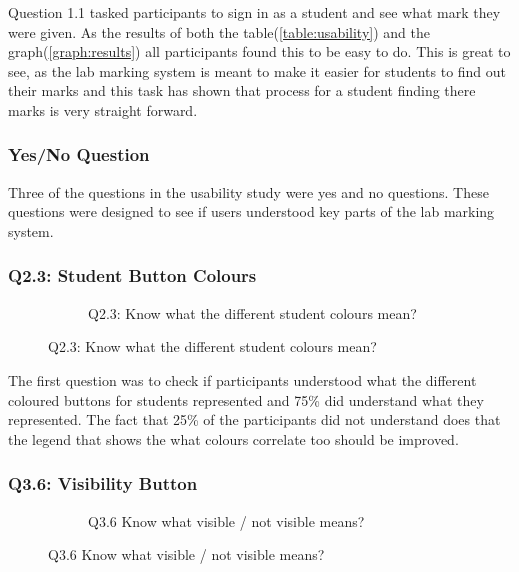 \documentclass[12pt]{article}  %
\begin{document}
\noindent Question 1.1 tasked participants to sign in as a student and see what mark they were given. As the results of both the table(\ref{table:usability}) and the graph(\ref{graph:results}) all participants found this to be easy to do. This is great to see, as the lab marking system is meant to make it easier for students to find out their marks and this task has shown that process for a student finding there marks is very straight forward.


\subsubsection*{Yes/No Question}
Three of the questions in the usability study were yes and no questions. These questions were designed to see if users understood key parts of the lab marking system.

\subsubsection*{Q2.3: Student Button Colours}

\begin{figure}
\vspace*{-\baselineskip}
\begin{figure}[H]
\caption{Q2.3: Know what the different student colours mean?}


\end{figure}
\end{figure}

The first question was to check if participants understood what the different coloured buttons for students represented and 75\% did understand what they represented. The fact that 25\% of the participants did not understand does that the legend that shows the what colours correlate too should be improved.




\subsubsection*{Q3.6: Visibility Button}

\begin{figure}
\vspace*{-\baselineskip}
\begin{figure}[H]
\caption{Q3.6 Know what visible / not visible means?}


\end{figure}
\end{figure}
\end{document}
